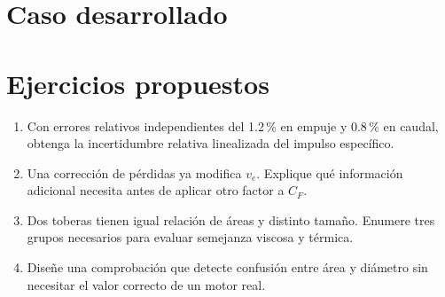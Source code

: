 \section{Caso desarrollado}

\section{Ejercicios propuestos}
\begin{enumerate}
\item Con errores relativos independientes del 1.2\,\% en empuje y 0.8\,\% en caudal, obtenga la incertidumbre relativa linealizada del impulso específico.
\item Una corrección de pérdidas ya modifica $v_e$. Explique qué información adicional necesita antes de aplicar otro factor a $C_F$.
\item Dos toberas tienen igual relación de áreas y distinto tamaño. Enumere tres grupos necesarios para evaluar semejanza viscosa y térmica.
\item Diseñe una comprobación que detecte confusión entre área y diámetro sin necesitar el valor correcto de un motor real.
\end{enumerate}


\studiumchaptercheck
